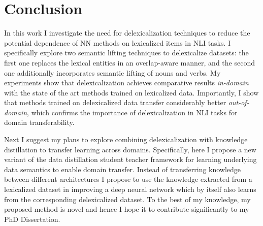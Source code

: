 \documentclass{article}
\begin{document}
\section{Conclusion}

 In this work I investigate the need for delexicalization techniques to reduce the potential dependence of NN methods on lexicalized items in NLI tasks. I specifically explore two semantic lifting techniques to delexicalize datasets: the first one replaces the lexical entities in an overlap-aware manner, and the second one additionally incorporates semantic lifting of nouns and verbs. My experiments show that delexicalization achieves comparative results {\em in-domain} with the state of the art methods trained on lexicalized data. Importantly, I show that methods trained on delexicalized data transfer considerably better {\em out-of-domain}, which  confirms the importance of delexicalization in NLI tasks for domain transferability. 
 
Next I suggest my plans to explore combining delexicalization with knowledge distillation to transfer learning across domains. Specifically, here  I propose a new variant of the data distillation student teacher framework for learning underlying data semantics to enable domain transfer. Instead of transferring knowledge between different architectures I propose to use the knowledge extracted from a lexicalized dataset in improving a deep neural network which by itself also learns from the corresponding delexicalized dataset. To the best of my knowledge, my proposed method is novel and hence I hope it to contribute significantly to my PhD Dissertation.




\balance
\begin{spacing}{0.88}


\end{spacing}

\end{document}
